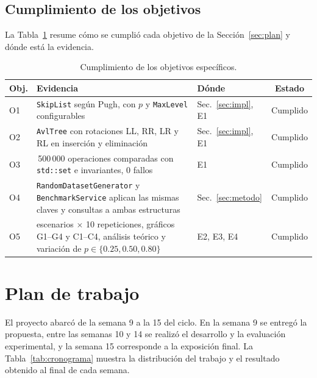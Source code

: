 \documentclass[11pt,a4paper]{article}
\begin{document}
\subsection{Cumplimiento de los objetivos}

La Tabla~\ref{tab:objetivos} resume cómo se cumplió cada objetivo de la
Sección~\ref{sec:plan} y dónde está la evidencia.

\begin{table}[!htb]
\centering
\renewcommand{\arraystretch}{1.2}
\small
\begin{tabularx}{\textwidth}{l >{\raggedright\arraybackslash}X l c}
\toprule
\textbf{Obj.} & \textbf{Evidencia} & \textbf{Dónde} & \textbf{Estado} \\
\midrule
O1 & \texttt{SkipList} según Pugh, con $p$ y \texttt{MaxLevel} configurables & Sec.~\ref{sec:impl}, E1 & Cumplido \\
O2 & \texttt{AvlTree} con rotaciones LL, RR, LR y RL en inserción y eliminación & Sec.~\ref{sec:impl}, E1 & Cumplido \\
O3 & 1\,500\,000 operaciones comparadas con \texttt{std::set} e invariantes, 0 fallos & E1 & Cumplido \\
O4 & \texttt{RandomDatasetGenerator} y \texttt{BenchmarkService} aplican las mismas claves y consultas a ambas estructuras & Sec.~\ref{sec:metodo} & Cumplido \\
O5 & 12 escenarios $\times$ 10 repeticiones, gráficos G1--G4 y C1--C4, análisis teórico y variación de $p \in \{0.25, 0.50, 0.80\}$ & E2, E3, E4 & Cumplido \\
\bottomrule
\end{tabularx}
\caption{Cumplimiento de los objetivos específicos.}
\label{tab:objetivos}
\end{table}

\section{Plan de trabajo}\label{sec:cronograma}

El proyecto abarcó de la semana 9 a la 15 del ciclo. En la semana 9 se entregó
la propuesta, entre las semanas 10 y 14 se realizó el desarrollo y la
evaluación experimental, y la semana 15 corresponde a la exposición final. La
Tabla~\ref{tab:cronograma} muestra la distribución del trabajo y el resultado
obtenido al final de cada semana.
\end{document}
